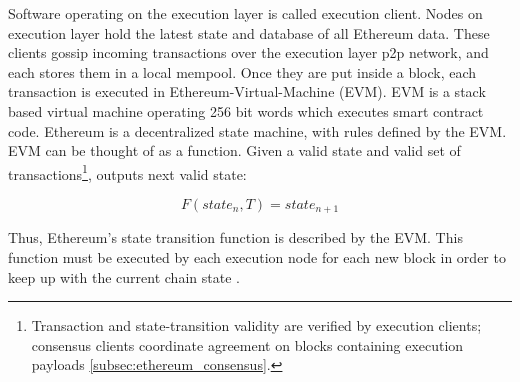 Software operating on the execution layer is called execution client. Nodes on
execution layer hold the latest state and database of all Ethereum data. These
clients gossip incoming transactions over the execution layer p2p network, and
each stores them in a local mempool. Once they are put inside a block, each
transaction is executed in Ethereum-Virtual-Machine (EVM). EVM is a stack based
virtual machine operating 256 bit words which executes smart contract code.
Ethereum is a decentralized state machine, with rules defined by the EVM.
EVM can be thought of as a function. Given a valid state and valid set of
transactions\footnote{Transaction and state-transition validity are verified by
	execution clients; consensus clients coordinate agreement on blocks containing execution payloads \ref{subsec:ethereum_consensus}.},
outputs next valid state:

\[
	F(state_n, T) = state_{n+1} \label{eq:state_transition}
\]

Thus, Ethereum's state transition function is described by the EVM. This function
must be executed by each execution node for each new block in order to keep up
with the current chain state \cite{ethereumEthereumVirtual}.


